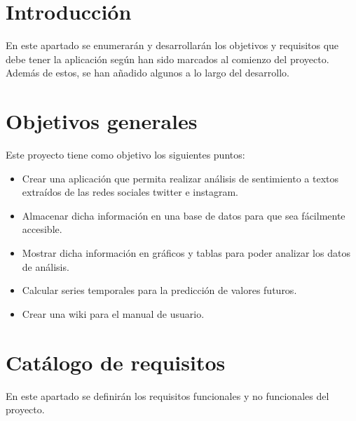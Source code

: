 
\section{Introducción}
En este apartado se enumerarán y desarrollarán los objetivos y requisitos que debe tener la aplicación según han sido marcados al comienzo del proyecto. Además de estos, se han añadido algunos a lo largo del desarrollo.

\section{Objetivos generales}
Este proyecto tiene como objetivo los siguientes puntos:
\begin{itemize}
\tightlist
    \item Crear una aplicación que permita realizar análisis de sentimiento a textos extraídos de las redes sociales twitter e instagram.
    \item Almacenar dicha información en una base de datos para que sea fácilmente accesible.
    \item Mostrar dicha información en gráficos y tablas para poder analizar los datos de análisis.
    \item Calcular series temporales para la predicción de valores futuros.
    \item Crear una wiki para el manual de usuario.
\end{itemize}
\newpage
\section{Catálogo de requisitos}
En este apartado se definirán los requisitos funcionales y no funcionales del proyecto.
